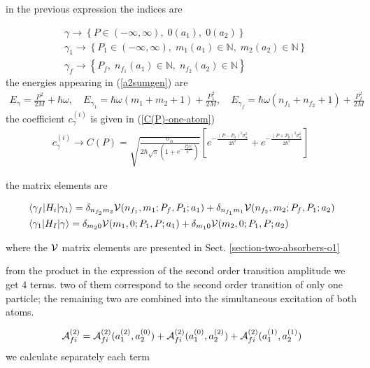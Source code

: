 in the previous expression the indices are
\begin{importantbox}
  \begin{align}
    & \gamma\rightarrow\left\{P\in({-\infty},\infty), \;0(a_1), \;0(a_2)\right\}                              \nonumber          \\
    & \gamma_1\rightarrow\left\{P_1\in({-\infty},\infty), \;m_1(a_1)\in{\mathbb{N}}, \;m_2(a_2)\in{\mathbb{N}}\right\} \nonumber \\
    & \gamma_f\rightarrow\left\{P_f,\; n_{f_1}(a_1)\in{\mathbb{N}}, \;n_{f_2}(a_2)\in{\mathbb{N}}\right\}
  \end{align}
  the energies appearing in (\ref{a2sumgen}) are
  \begin{align}
    E_{\gamma} = \frac{P^2}{2M}+\hbar\omega,\quad E_{\gamma_1} = \hbar\omega(m_1 + m_2 +1)+\frac{P_1^2}{2M},\quad E_{\gamma_f} = \hbar\omega(n_{f_1}+n_{f_2}+1)+\frac{P_f^2}{2M}
  \end{align}
  the coefficient $c_{\gamma}^{(i)}$ is given in (\ref{C(P)-one-atom})
  \begin{align}
    c_\gamma^{(i)}\rightarrow C(P) = \sqrt{\frac{\sigma_\alpha}{2\hbar\sqrt{\pi}\left(1+e^{-\frac{P_0^2\sigma_\alpha^2}{\hbar^2}}\right)}}\left[ e^{-\frac{(P-P_0)^2\sigma_\alpha^2}{2\hbar^2}} + e^{-\frac{(P+P_0)^2\sigma_\alpha^2}{2\hbar^2}} \right]\
  \end{align}
\end{importantbox}

the matrix elements are
\begin{importantbox}
  \begin{align}
    &\langle\gamma_f|H_i|\gamma_1\rangle = \delta_{n_{f_2}m_2}{\cal V}(n_{f_1},m_1;P_{f},P_1;a_1)+\delta_{n_{f_1}m_1}{\cal V}(n_{f_2},m_2;P_f,P_1;a_2)\\
    &\langle \gamma_1|H_I|\gamma \rangle   =\delta_{m_20}{\cal V}(m_1,0;P_1,P;a_1)+\delta_{m_10}{\cal V}(m_2,0;P_1,P;a_2)
  \end{align}
\end{importantbox}
where the ${\cal V}$ matrix elements are presented in  Sect. \ref{section-two-absorbers-o1}

from the product in the expression  of the second order transition amplitude we get 4 terms. two of them correspond to the second order transition of only one particle; the remaining two are combined into the simultaneous excitation of both atoms.

\begin{align}
  {\cal A}_{fi}^{(2)} = {\cal A}_{fi}^{(2)}(a_1^{(2)}, a_2^{(0)})+{\cal A}_{fi}^{(2)}(a_1^{(0)}, a_2^{(2)})+{\cal A}_{fi}^{(2)}(a_1^{(1)}, a_2^{(1)})
\end{align}
we calculate separately each term

